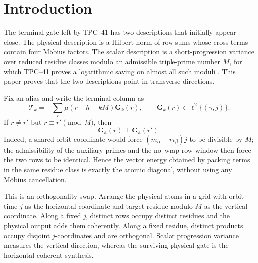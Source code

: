 \section{Introduction}
\label{sec:tpc42-introduction}

The terminal gate left by TPC--41 has two descriptions that initially
appear close.  The physical description is a Hilbert norm of row sums
whose cross terms contain four M\"obius factors.  The scalar description
is a short-progression variance over reduced residue classes modulo an
admissible triple-prime number \(M\), for which TPC--41 proves a
logarithmic saving on almost all such
moduli \citep{WangTPC41,KlurmanMangerelTeravainen2023}.  This paper proves
that the two descriptions point in transverse directions.

Fix an alias and write the terminal column as
\begin{equation}
 \mathscr T_k
 =-\sum_r\mu(r+h+kM)\mathbf G_k(r),
 \qquad
 \mathbf G_k(r)\in\ell^2\{(\gamma,j)\}.
 \label{eq:tpc42-intro-column}
\end{equation}
If \(r\ne r'\) but \(r\equiv r'\pmod M\), then
\begin{equation}
 \boxed{\mathbf G_k(r)\perp\mathbf G_k(r').}
 \label{eq:tpc42-intro-fiber-orthogonality}
\end{equation}
Indeed, a shared orbit coordinate would force
\((m_\alpha-m_\beta)j\) to be divisible by \(M\); the admissibility of
the auxiliary primes and the no--wrap row window then force the two rows
to be identical.  Hence the vector energy obtained by packing terms in
the same residue class is exactly the atomic diagonal, without using any
M\"obius cancellation.

This is an orthogonality swap.  Arrange the physical atoms in a grid with
orbit time \(j\) as the horizontal coordinate and target residue modulo
\(M\) as the vertical coordinate.  Along a fixed \(j\), distinct rows
occupy distinct residues and the physical output adds them coherently.
Along a fixed residue, distinct products occupy disjoint \(j\)-coordinates
and are orthogonal.  Scalar progression variance measures the vertical
direction, whereas the surviving physical gate is the horizontal
coherent synthesis.

